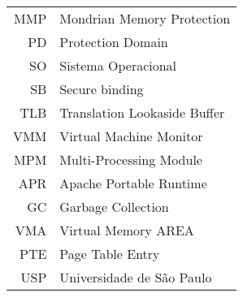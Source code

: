 {
\raggedbottom



\begin{tabular}{rl}
  MMP      & Mondrian Memory Protection\\
  PD       & Protection Domain\\
  SO       & Sistema Operacional\\
  SB       & Secure binding \\
  TLB      & Translation Lookaside Buffer \\
  VMM      & Virtual Machine Monitor \\
  MPM      & Multi-Processing Module \\
  APR      & Apache Portable Runtime \\
  GC       & Garbage Collection \\
  VMA      & Virtual Memory AREA\\
  PTE      & Page Table Entry\\
  USP      & Universidade de São Paulo
\end{tabular}


}
